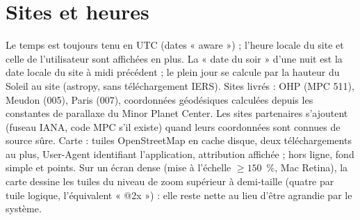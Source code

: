 \section{Sites et heures}
Le temps est toujours tenu en UTC (dates « aware ») ; l'heure locale du site et celle de l'utilisateur sont
affichées en plus. La « date du soir » d'une nuit est la date locale du site à midi précédent ; le plein jour se
calcule par la hauteur du Soleil au site (astropy, sans téléchargement IERS). Sites livrés : OHP (MPC 511), Meudon
(005), Paris (007), coordonnées géodésiques calculées depuis les constantes de parallaxe du Minor Planet Center.
Les sites partenaires s'ajoutent (fuseau IANA, code MPC s'il existe) quand leurs coordonnées sont connues de
source sûre. Carte : tuiles OpenStreetMap en cache disque, deux téléchargements au plus, User-Agent identifiant
l'application, attribution affichée ; hors ligne, fond simple et points. Sur un écran dense (mise à l'échelle
$\geq 150$~\%, Mac Retina), la carte dessine les tuiles du niveau de zoom supérieur à demi-taille (quatre par tuile
logique, l'équivalent « @2x ») : elle reste nette au lieu d'être agrandie par le système.

